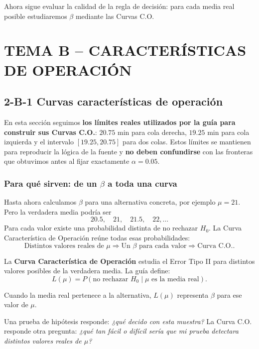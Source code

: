 \documentclass[11pt,a4paper]{article}
\begin{document}
\begin{regla}
Ahora sigue evaluar la calidad de la regla de decisión: para cada media real posible estudiaremos $\beta$ mediante las Curvas C.O.
\end{regla}

\section{TEMA B -- CARACTERÍSTICAS DE OPERACIÓN}
\subsection{2-B-1 Curvas características de operación}

\begin{aclaracion}
En esta sección seguimos \textbf{los límites reales utilizados por la guía para construir sus Curvas C.O.}: $20.75$ min para cola derecha, $19.25$ min para cola izquierda y el intervalo $[19.25,20.75]$ para dos colas. Estos límites se mantienen para reproducir la lógica de la fuente y \textbf{no deben confundirse} con las fronteras que obtuvimos antes al fijar exactamente $\alpha=0.05$.
\end{aclaracion}

\subsubsection{\texorpdfstring{Para qué sirven: de un $\beta$ a toda una curva}{Para qué sirven: de un beta a toda una curva}}

Hasta ahora calculamos $\beta$ para una alternativa concreta, por ejemplo $\mu=21$. Pero la verdadera media podría ser
\[
20.5,\quad21,\quad21.5,\quad22,\ldots
\]
Para cada valor existe una probabilidad distinta de no rechazar $H_0$. La Curva Característica de Operación reúne todas esas probabilidades:
\[
\boxed{\text{Distintos valores reales de }\mu}
\Longrightarrow
\boxed{\text{Un }\beta\text{ para cada valor}}
\Longrightarrow
\boxed{\text{Curva C.O.}}.
\]

La \textbf{Curva Característica de Operación} estudia el Error Tipo II para distintos valores posibles de la verdadera media. La guía define:
\[
L(\mu)=P(\text{no rechazar }H_0\mid \mu\text{ es la media real}).
\]

Cuando la media real pertenece a la alternativa, $L(\mu)$ representa $\beta$ para ese valor de $\mu$.

\begin{ideaclave}
Una prueba de hipótesis responde: \emph{¿qué decido con esta muestra?} La Curva C.O. responde otra pregunta: \emph{¿qué tan fácil o difícil sería que mi prueba detectara distintos valores reales de $\mu$?}
\end{ideaclave}
\end{document}
